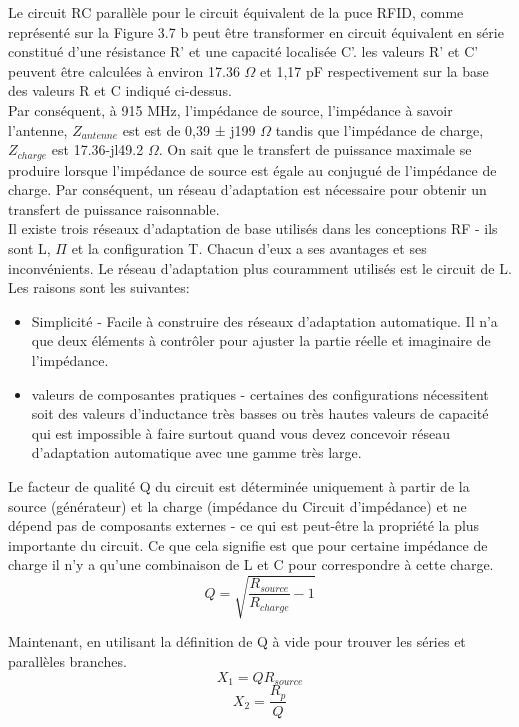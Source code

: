 \documentclass[11pt, a4paper, twoside]{book}
\begin{document}
Le circuit RC parallèle pour le circuit équivalent de la puce RFID, comme représenté sur la Figure 3.7 b peut être transformer en circuit équivalent en série constitué d'une résistance  R' et une capacité localisée C'. les valeurs R' et C'  peuvent être calculées à environ 17.36 \(\Omega\) et 1,17 pF respectivement sur la base des valeurs R et C indiqué ci-dessus.\\


Par conséquent, à 915 MHz, l'impédance de source, l'impédance à savoir l'antenne, \(Z_{antenne} \) est est de 0,39 ± j199 \(\Omega\) tandis que l'impédance de charge, \(Z_{charge} \) est 17.36-jl49.2 \(\Omega\). On sait que le transfert de puissance maximale se produire lorsque l'impédance de source est égale au conjugué de l'impédance de charge. Par conséquent, un réseau d'adaptation est nécessaire pour obtenir un transfert de puissance raisonnable.\\

Il existe trois réseaux d'adaptation de base utilisés dans les conceptions RF - ils sont L, \(\Pi\) et la configuration T. Chacun d'eux a ses avantages et ses inconvénients. Le réseau d'adaptation plus couramment utilisés est le circuit de L. Les raisons sont les suivantes:
\begin{itemize}
\item Simplicité - Facile à construire des réseaux d'adaptation automatique. Il n'a que deux éléments à contrôler pour ajuster la partie réelle et imaginaire de l'impédance.
\item valeurs de composantes pratiques - certaines des configurations nécessitent soit des valeurs d'inductance très basses ou très hautes valeurs de capacité qui est impossible à faire surtout quand vous devez concevoir réseau d'adaptation automatique avec une gamme très large.\\
\end{itemize}

Le facteur de qualité Q du circuit est déterminée uniquement à partir de la source (générateur) et la charge (impédance du Circuit d'impédance) et ne dépend pas de composants externes - ce qui est peut-être la propriété la plus importante du circuit. Ce que cela signifie est que pour certaine impédance de charge il n'y a qu'une combinaison de L et C pour correspondre à cette charge.
\begin{equation}
Q = \sqrt{\dfrac{R_{source}}{R_{charge}}-1}
\end{equation}

Maintenant, en utilisant la définition de Q à vide pour trouver les séries et parallèles branches.
\begin{equation}
X_{1}=QR_{source}
\end{equation}
\begin{equation}
X_{2}=\dfrac{R_{p}}{Q}
\end{equation}
\end{document}
